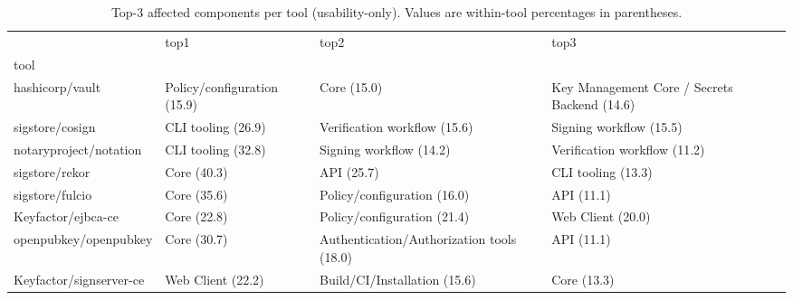 \begin{table}[t]
\centering
\caption{Top-3 affected components per tool (usability-only). Values are within-tool percentages in parentheses.}
\label{tab:rq2-top3-components-by-tool}
\scriptsize
\begin{tabular}{llll}
\toprule
 & top1 & top2 & top3 \\
tool &  &  &  \\
\midrule
hashicorp/vault & Policy/configuration (15.9) & Core (15.0) & Key Management Core / Secrets Backend (14.6) \\
sigstore/cosign & CLI tooling (26.9) & Verification workflow (15.6) & Signing workflow (15.5) \\
notaryproject/notation & CLI tooling (32.8) & Signing workflow (14.2) & Verification workflow (11.2) \\
sigstore/rekor & Core (40.3) & API (25.7) & CLI tooling (13.3) \\
sigstore/fulcio & Core (35.6) & Policy/configuration (16.0) & API (11.1) \\
Keyfactor/ejbca-ce & Core (22.8) & Policy/configuration (21.4) & Web Client (20.0) \\
openpubkey/openpubkey & Core (30.7) & Authentication/Authorization tools (18.0) & API (11.1) \\
Keyfactor/signserver-ce & Web Client (22.2) & Build/CI/Installation (15.6) & Core (13.3) \\
\bottomrule
\end{tabular}

\end{table}
